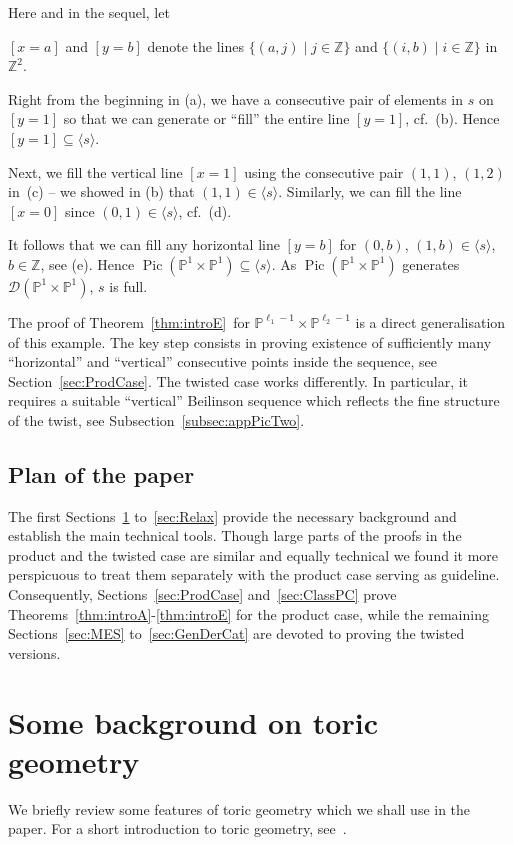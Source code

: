 \documentclass[11pt]{article}
\theoremstyle{definition}
\numberwithin{equation}{section}
\newcommand{\PP}{\mathbb P}
\newcommand{\Z}{\mathbb Z}
\newcommand{\CD}{{\mathcal D}}
\newcommand{\Pic}{\operatorname{Pic}}
\newcommand{\cl}{s}
\newcommand{\ssect}[1]{Subsection~\ref{#1}}
\newcommand{\thLex}{\ref{thm:introA}}
\newcommand{\thFull}{\ref{thm:introE}}
\begin{document}
Here and in the sequel, let 
\begin{center}
{$[x=a]$ and $[y=b]$ denote the lines $\{(a,j)\mid j\in\Z\}$ 
and $\{(i,b)\mid i\in\Z\}$ in $\Z^2$.}
\end{center}
{Right from the beginning in (a), we} have a 
consecutive pair of elements in $\cl$ on $[y=1]$ 
so that we can generate or ``fill'' the entire 
line $[y=1]$, cf.\ (b). Hence $[y=1]\subseteq\langle
\cl\rangle$.

Next, we fill the vertical line $[x=1]$ 
using the consecutive pair $(1,1)$, $(1,2)$ in~(c) -- we showed in (b) that $(1,1)\in
\langle\cl\rangle$. Similarly, we can fill 
the line $[x=0]$ since $(0,1)\in\langle\cl\rangle$, 
cf.\ (d).

It follows that we can fill any horizontal 
line $[y=b]$ for $(0,b)$, $(1,b)\in\langle\cl\rangle$, 
$b\in\Z$, see (e). Hence $\Pic(\PP^1\times\PP^1)
\subseteq\langle\cl\rangle$. As 
$\Pic(\PP^1\times\PP^1)$ generates 
$\CD(\PP^1\times\PP^1)$, $\cl$ is full. 

The proof of Theorem~\thFull\ for 
$\PP^{\ell_1-1}\times\PP^{\ell_2-1}$ is a direct 
generalisation of this example. The key step 
consists in proving existence of sufficiently many 
``horizontal'' and ``vertical'' consecutive points 
inside the sequence, see Section~\ref{sec:ProdCase}. 
The twisted case works differently.
In particular, it requires a suitable ``vertical'' 
Beilinson sequence which reflects the fine structure 
of the twist, see \ssect{subsec:appPicTwo}. 

\subsection{Plan of the paper}
\label{subsec:PlanPaper}
The first Sections~\ref{sec:TorGeo} to~\ref{sec:Relax} 
provide the 
necessary background and establish the {main} technical 
tools. 
{Though large parts of the proofs in the product 
and the twisted case are similar and equally technical}
we found it more perspicuous to 
treat them separately with the product case serving as 
guideline. {Consequently, Sections~\ref{sec:ProdCase}
and~\ref{sec:ClassPC} prove Theorems~{\thLex}-{\thFull} 
for the product case, while 
the remaining Sections~\ref{sec:MES} to~\ref{sec:GenDerCat} 
are devoted to proving the twisted versions.}

\section{Some background on toric geometry}
\label{sec:TorGeo}
We briefly review some features of toric 
geometry which we shall use in the paper.
For a short introduction to toric geometry, 
see~\cite{fultonToric}.
\end{document}

